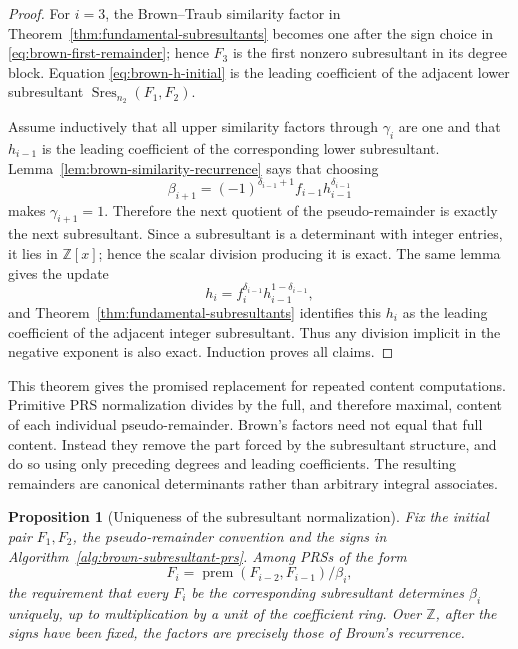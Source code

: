 \documentclass[11pt]{book}
\newtheorem{proposition}[theorem]{Proposition}
\theoremstyle{definition}
\newcommand{\ZZ}{\mathbb Z}
\begin{document}
\begin{proof}
For $i=3$, the Brown--Traub similarity factor in
Theorem~\ref{thm:fundamental-subresultants} becomes one after the sign choice
in \eqref{eq:brown-first-remainder}; hence $F_3$ is the first nonzero
subresultant in its degree block.  Equation \eqref{eq:brown-h-initial} is the
leading coefficient of the adjacent lower subresultant
$\operatorname{Sres}_{n_2}(F_1,F_2)$.

Assume inductively that all upper similarity factors through $\gamma_i$ are
one and that $h_{i-1}$ is the leading coefficient of the corresponding lower
subresultant.  Lemma~\ref{lem:brown-similarity-recurrence} says that choosing
\[
 \beta_{i+1}
 =(-1)^{\delta_{i-1}+1}
   f_{i-1}h_{i-1}^{\delta_{i-1}}
\]
makes $\gamma_{i+1}=1$.  Therefore the next quotient of the pseudo-remainder
is exactly the next subresultant.  Since a subresultant is a determinant with
integer entries, it lies in $\ZZ[x]$; hence the scalar division producing it
is exact.  The same lemma gives the update
\[
 h_i=f_i^{\delta_{i-1}}h_{i-1}^{1-\delta_{i-1}},
\]
and Theorem~\ref{thm:fundamental-subresultants} identifies this $h_i$ as the
leading coefficient of the adjacent integer subresultant.  Thus any division
implicit in the negative exponent is also exact.  Induction proves all
claims.
\end{proof}

This theorem gives the promised replacement for repeated content
computations.  Primitive PRS normalization divides by the full, and therefore
maximal, content of each individual pseudo-remainder.  Brown's factors need
not equal that full content.  Instead they remove the part forced by the
subresultant structure, and do so using only preceding degrees and leading
coefficients.  The resulting remainders are canonical determinants rather
than arbitrary integral associates.

\begin{proposition}[Uniqueness of the subresultant normalization]
\label{prop:subresultant-normalization-unique}
Fix the initial pair $F_1,F_2$, the pseudo-remainder convention and the signs
in Algorithm~\ref{alg:brown-subresultant-prs}.  Among PRSs of the form
\[
 F_i=\operatorname{prem}(F_{i-2},F_{i-1})/\beta_i,
\]
the requirement that every $F_i$ be the corresponding subresultant determines
$\beta_i$ uniquely, up to multiplication by a unit of the coefficient ring.
Over $\ZZ$, after the signs have been fixed, the factors are precisely those
of Brown's recurrence.
\end{proposition}
\end{document}
